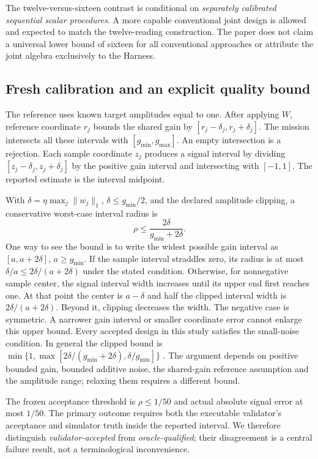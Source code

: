 \documentclass[11pt]{article}
\begin{document}
The twelve-versus-sixteen contrast is conditional on \emph{separately calibrated sequential scalar procedures}. A more capable conventional joint design is allowed and expected to match the twelve-reading construction. The paper does not claim a universal lower bound of sixteen for all conventional approaches or attribute the joint algebra exclusively to the Harness.

\subsection{Fresh calibration and an explicit quality bound}

The reference uses known target amplitudes equal to one. After applying $W$, reference coordinate $r_j$ bounds the shared gain by $[r_j-\delta_j,r_j+\delta_j]$. The mission intersects all these intervals with $[g_{\min},g_{\max}]$. An empty intersection is a rejection. Each sample coordinate $z_j$ produces a signal interval by dividing $[z_j-\delta_j,z_j+\delta_j]$ by the positive gain interval and intersecting with $[-1,1]$. The reported estimate is the interval midpoint.

With $\delta=\eta\max_j\|w_j\|_1$, $\delta\leq g_{\min}/2$, and the declared amplitude clipping, a conservative worst-case interval radius is
\begin{equation}
\rho\leq \frac{2\delta}{g_{\min}+2\delta}.
\label{eq:radius}
\end{equation}
One way to see the bound is to write the widest possible gain interval as $[a,a+2\delta]$, $a\geq g_{\min}$. If the sample interval straddles zero, its radius is at most $\delta/a\leq2\delta/(a+2\delta)$ under the stated condition. Otherwise, for nonnegative sample center, the signal interval width increases until its upper end first reaches one. At that point the center is $a-\delta$ and half the clipped interval width is $2\delta/(a+2\delta)$. Beyond it, clipping decreases the width. The negative case is symmetric. A narrower gain interval or smaller coordinate error cannot enlarge this upper bound. Every accepted design in this study satisfies the small-noise condition. In general the clipped bound is $\min\{1,\max[2\delta/(g_{\min}+2\delta),\delta/g_{\min}]\}$ \cite{outlearn}. The argument depends on positive bounded gain, bounded additive noise, the shared-gain reference assumption and the amplitude range; relaxing them requires a different bound.

The frozen acceptance threshold is $\rho\leq1/50$ and actual absolute signal error at most $1/50$. The primary outcome requires both the executable validator's acceptance and simulator truth inside the reported interval. We therefore distinguish \emph{validator-accepted} from \emph{oracle-qualified}; their disagreement is a central failure result, not a terminological inconvenience.
\end{document}
